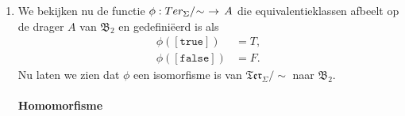 \documentclass[a4paper,11pt]{article}
\begin{document}
\begin{enumerate}
\item %

We bekijken nu de functie $\phi : Ter_{\Sigma}/\negmedspace\sim \,\,
\rightarrow \, A$ die equivalentieklassen afbeelt op de drager $A$ van
$\mathfrak{B}_{2}$ en gedefini\"eerd is als
\begin{align*}
\phi([\texttt{true}])  &= T, \\
\phi([\texttt{false}]) &= F.
\end{align*}
Nu laten we zien dat $\phi$ een isomorfisme is van
$\mathfrak{Ter}_{\Sigma}/\sim$ naar $\mathfrak{B}_{2}$.

\paragraph{Homomorfisme}


\end{enumerate}
\end{document}
